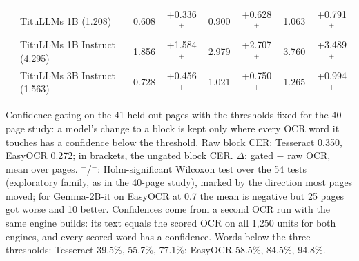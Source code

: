 \begin{table}[t]
\begin{tabular}{llcccccc}
& TituLLMs 1B (1.208) & 0.608 & +0.336$^{+}$ & 0.900 & +0.628$^{+}$ & 1.063 & +0.791$^{+}$ \\
& TituLLMs 1B Instruct (4.295) & 1.856 & +1.584$^{+}$ & 2.979 & +2.707$^{+}$ & 3.760 & +3.489$^{+}$ \\
& TituLLMs 3B Instruct (1.563) & 0.728 & +0.456$^{+}$ & 1.021 & +0.750$^{+}$ & 1.265 & +0.994$^{+}$ \\
\bottomrule
\end{tabular}
\par\smallskip
\begin{minipage}{\linewidth}\footnotesize Confidence gating on the 41 held-out pages with the thresholds fixed for the 40-page study: a model's change to a block is kept only where every OCR word it touches has a confidence below the threshold. Raw block CER: Tesseract 0.350, EasyOCR 0.272; in brackets, the ungated block CER. $\Delta$: gated $-$ raw OCR, mean over pages. $^{+}$/$^{-}$: Holm-significant Wilcoxon test over the 54 tests (exploratory family, as in the 40-page study), marked by the direction most pages moved; for Gemma-2B-it on EasyOCR at 0.7 the mean is negative but 25 pages got worse and 10 better. Confidences come from a second OCR run with the same engine builds: its text equals the scored OCR on all 1{,}250 units for both engines, and every scored word has a confidence. Words below the three thresholds: Tesseract 39.5\%, 55.7\%, 77.1\%; EasyOCR 58.5\%, 84.5\%, 94.8\%.\end{minipage}
\end{table}
